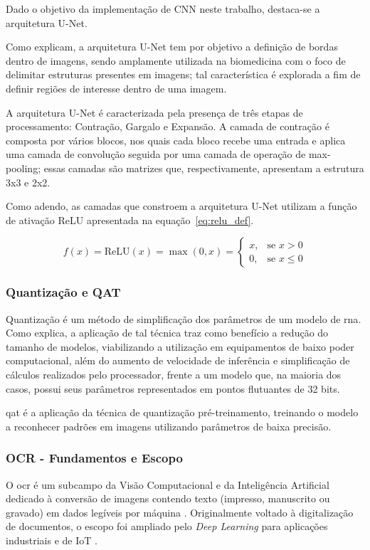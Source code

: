 Dado o objetivo da implementação de CNN neste trabalho, 
destaca-se a arquitetura U-Net. 

Como  explicam,
a arquitetura U-Net tem por objetivo a definição de bordas dentro de imagens, 
sendo amplamente utilizada na biomedicina com o foco de delimitar 
estruturas presentes em imagens; tal característica é explorada a fim de definir 
regiões de interesse dentro de uma imagem.

A arquitetura U-Net é caracterizada pela presença de três etapas de 
processamento: Contração, Gargalo e Expansão. 
A camada de contração é composta por vários blocos, 
nos quais cada bloco recebe uma entrada e aplica uma camada de convolução seguida por 
uma camada de operação de max-pooling; essas camadas são matrizes 
que, respectivamente, apresentam a estrutura 3x3 e 2x2.

Como adendo, as camadas que constroem a arquitetura U-Net utilizam a função de ativação ReLU 
apresentada na equação~\ref{eq:relu_def}.

\begin{equation}
    f(x) = \text{ReLU}(x) = \max(0, x) = 
    \begin{cases} 
        x, & \text{se } x > 0 \\ 
        0, & \text{se } x \le 0 
    \end{cases}
    \label{eq:relu_def}
\end{equation}

\subsubsection{Quantização e QAT}

Quantização é um método de simplificação dos parâmetros de um modelo de \gls{rna}. 
Como  explica, a aplicação de tal técnica 
traz como benefício a redução do tamanho de modelos, 
viabilizando a utilização em equipamentos de baixo poder computacional, 
além do aumento de velocidade de inferência e simplificação de cálculos realizados pelo processador, 
frente a um modelo que, na maioria dos casos, possui seus parâmetros representados em pontos 
flutuantes de 32 bits. 

\gls{qat} é a aplicação da técnica de quantização pré-treinamento, 
treinando o modelo a reconhecer padrões em imagens utilizando parâmetros de baixa precisão.

\subsubsection{OCR - Fundamentos e Escopo}
O \gls{ocr} é um subcampo da Visão Computacional e da Inteligência Artificial 
dedicado à conversão de imagens contendo texto (impresso, manuscrito ou gravado) 
em dados legíveis por máquina \cite{chen2021survey}. 
Originalmente voltado à digitalização de documentos, 
o escopo foi ampliado pelo \textit{Deep Learning} 
para aplicações industriais e de IoT \cite{jawas2018water}.

